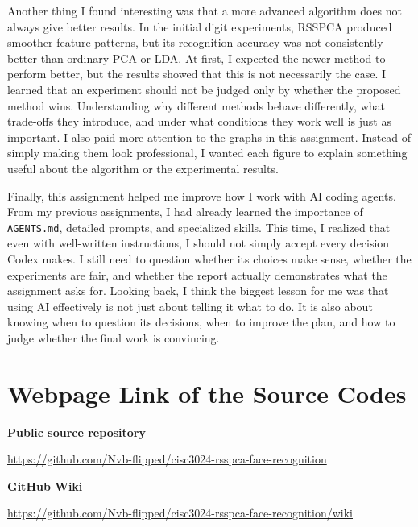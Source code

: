 Another thing I found interesting was that a more advanced algorithm does not always give better results. In the initial digit experiments, RSSPCA produced smoother feature patterns, but its recognition accuracy was not consistently better than ordinary PCA or LDA. At first, I expected the newer method to perform better, but the results showed that this is not necessarily the case. I learned that an experiment should not be judged only by whether the proposed method wins. Understanding why different methods behave differently, what trade-offs they introduce, and under what conditions they work well is just as important. I also paid more attention to the graphs in this assignment. Instead of simply making them look professional, I wanted each figure to explain something useful about the algorithm or the experimental results.

Finally, this assignment helped me improve how I work with AI coding agents. From my previous assignments, I had already learned the importance of \texttt{AGENTS.md}, detailed prompts, and specialized skills. This time, I realized that even with well-written instructions, I should not simply accept every decision Codex makes. I still need to question whether its choices make sense, whether the experiments are fair, and whether the report actually demonstrates what the assignment asks for. Looking back, I think the biggest lesson for me was that using AI effectively is not just about telling it what to do. It is also about knowing when to question its decisions, when to improve the plan, and how to judge whether the final work is convincing.

\clearpage
\section{Webpage Link of the Source Codes}
\noindent\colorbox{pale}{\parbox{\dimexpr\linewidth-2\fboxsep\relax}{%
\textbf{Public source repository}\par
\url{https://github.com/Nvb-flipped/cisc3024-rsspca-face-recognition}\par
\textbf{GitHub Wiki}\par
\url{https://github.com/Nvb-flipped/cisc3024-rsspca-face-recognition/wiki}}}\par

